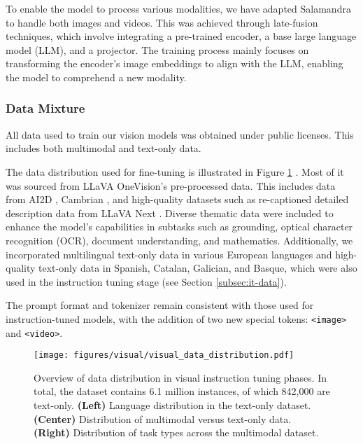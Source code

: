 To enable the model to process various modalities, we have adapted Salamandra to handle both images and videos. This was achieved through late-fusion techniques, which involve integrating a pre-trained encoder, a base large language model (LLM), and a projector. The training process mainly focuses on transforming the encoder's image embeddings to align with the LLM, enabling the model to comprehend a new modality.


\subsubsection{Data Mixture}

All data used to train our vision models was obtained under public licenses. This includes both multimodal and text-only data.

The data distribution used for fine-tuning is illustrated in Figure \ref{fig:visual_data_distr} . Most of it was sourced from LLaVA OneVision's \cite{llavaonevision} pre-processed data. This includes data from AI2D \cite{ai2d}, Cambrian \cite{cambrian1}, and high-quality datasets such as re-captioned detailed description data from LLaVA Next \cite{llavanext}. Diverse thematic data were included to enhance the model's capabilities in subtasks such as grounding, optical character recognition (OCR), document understanding, and mathematics. Additionally, we incorporated multilingual text-only data in various European languages and high-quality text-only data in Spanish, Catalan, Galician, and Basque, which were also used in the instruction tuning stage (see Section \ref{subsec:it-data}).

The prompt format and tokenizer remain consistent with those used for instruction-tuned models, with the addition of two new special tokens: \texttt{<image>} and \texttt{<video>}.

\begin{figure}[htp]
    \centering
    \texttt{[image: figures/visual/visual\_data\_distribution.pdf]}
    \caption{Overview of data distribution in visual instruction tuning phases. In total, the dataset contains 6.1 million instances, of which 842,000 are text-only. \textbf{(Left)} Language distribution in the text-only dataset. \textbf{(Center)} Distribution of multimodal versus text-only data. \textbf{(Right)} Distribution of task types across the multimodal dataset.}
    \label{fig:visual_data_distr}
\end{figure}

